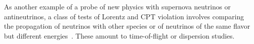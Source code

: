 
As another example of a probe of new physics with supernova neutrinos or antineutrinos,
a class of tests of Lorentz and CPT violation involves comparing the propagation of neutrinos with other species or of neutrinos of the same flavor but different energies~\cite{Kostelecky:2003cr,Kostelecky:2003xn,Kostelecky:2011gq,Diaz:2009qk}. These amount to time-of-flight or dispersion studies.

